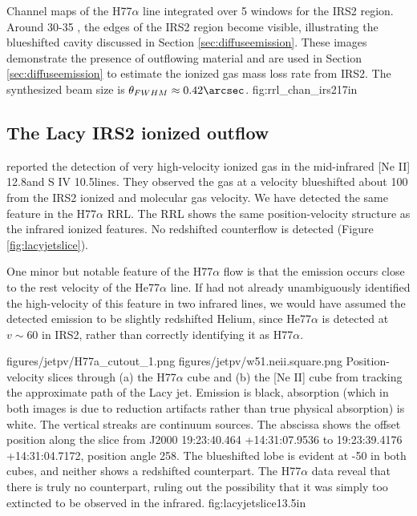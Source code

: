 {Channel maps of the H77$\alpha$ line integrated over 5 \kms windows
for the IRS2 region.  Around 30-35 \kms, the edges of the IRS2 region become
visible, illustrating the blueshifted cavity discussed in Section
\ref{sec:diffuseemission}.  These images demonstrate the presence of outflowing
material and are used in Section \ref{sec:diffuseemission} to estimate the
ionized gas mass loss rate from IRS2.
The synthesized beam size is $\theta_{FWHM}\approx0.42\arcsec$.
}
{fig:rrl_chan_irs2}{1}{7in}


\subsection{The Lacy IRS2 ionized outflow}
\label{sec:lacyjet}
\citet{Lacy2007a} reported the detection of very high-velocity ionized gas
in the mid-infrared [Ne II] 12.8\um and S IV 10.5\um lines.  They observed the
gas at a velocity blueshifted about 100 \kms from the IRS2 ionized and molecular
gas velocity.  We have detected the same feature in the H77$\alpha$ RRL.
The RRL shows the same position-velocity structure as the infrared ionized
features.  No redshifted counterflow is detected (Figure \ref{fig:lacyjetslice}).

One minor but notable feature of the H77$\alpha$ flow is that the emission
occurs close to the rest velocity of the He77$\alpha$ line.  If
\citet{Lacy2007a} had not already unambiguously identified the high-velocity of
this feature in two infrared lines, we would have assumed the detected emission
to be slightly redshifted Helium, since He77$\alpha$ is detected at $v\sim60$
\kms in IRS2, rather than correctly identifying it as H77$\alpha$.

\FigureTwo
{figures/jetpv/H77a_cutout_1.png}
{figures/jetpv/w51.neii.square.png}
{Position-velocity slices through (a) the H77$\alpha$ cube and (b) the [Ne II]
cube from \citet{Lacy2007a} tracking the approximate path of the Lacy jet.  Emission is black,
absorption (which in both images is due to reduction artifacts rather than true
physical absorption) is white.  The vertical streaks are continuum sources.
The
abscissa shows the offset position along the slice from J2000 19:23:40.464
+14:31:07.9536 to 19:23:39.4176 +14:31:04.7172, position angle 258\arcdeg.
The blueshifted lobe is evident at -50 \kms in both cubes, and neither shows a
redshifted counterpart.  The H77$\alpha$ data reveal that there is truly no
counterpart, ruling out the possibility that it was simply too extincted to be
observed in the infrared.}
{fig:lacyjetslice}{1}{3.5in}


